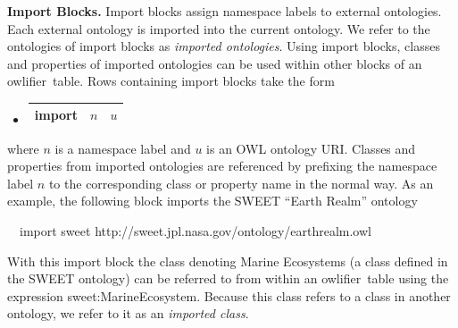 \documentclass[5p,authoryear]{elsarticle}
\newcommand{\owlifier}{\textsf{owlifier}}
\newcommand{\myblock}[1]{\vspace{12pt}\noindent\textbf{#1}}
\begin{document}
\myblock{Import Blocks.} Import blocks assign namespace labels to
external ontologies. Each external ontology is imported into the
current ontology. We refer to the ontologies of import blocks as
\emph{imported ontologies}.  Using import blocks, classes and
properties of imported ontologies can be used within other blocks of
an \owlifier\ table.  Rows containing import blocks take the form
\begin{itemize}
\item[]
  \begin{tabular}{|l|l|l|}\hline
    \textsf{import} & $n$ & $u$ \\ \hline 
  \end{tabular} 
\end{itemize}
where $n$ is a namespace label and $u$ is an OWL ontology URI. Classes
and properties from imported ontologies are referenced by prefixing
the namespace label $n$ to the corresponding class or property name in
the normal way. As an example, the following block imports the SWEET
``Earth Realm'' ontology \citep{raskin05}
\begin{small}
\begin{tabbing}
  ~~\textsf{import}  \textsf{sweet} 
  \textsf{http://sweet.jpl.nasa.gov/ontology/earthrealm.owl}
\end{tabbing}
\end{small}
With this import block the class denoting Marine Ecosystems (a class
defined in the SWEET ontology) can be referred to from within an
\owlifier\ table using the expression
\textsf{sweet:MarineEcosystem}. Because this class refers to a class
in another ontology, we refer to it as an \emph{imported class}.
\end{document}
